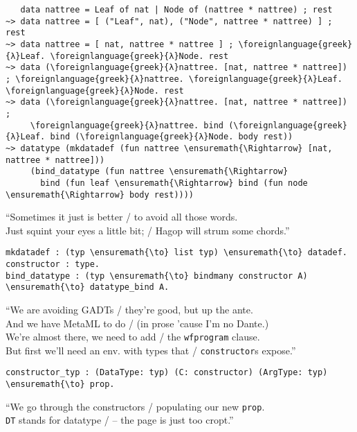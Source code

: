 \begin{verbatim}
   data nattree = Leaf of nat | Node of (nattree * nattree) ; rest
~> data nattree = [ ("Leaf", nat), ("Node", nattree * nattree) ] ; rest
~> data nattree = [ nat, nattree * nattree ] ; \foreignlanguage{greek}{λ}Leaf. \foreignlanguage{greek}{λ}Node. rest
~> data (\foreignlanguage{greek}{λ}nattree. [nat, nattree * nattree]) ; \foreignlanguage{greek}{λ}nattree. \foreignlanguage{greek}{λ}Leaf. \foreignlanguage{greek}{λ}Node. rest
~> data (\foreignlanguage{greek}{λ}nattree. [nat, nattree * nattree]) ;
     \foreignlanguage{greek}{λ}nattree. bind (\foreignlanguage{greek}{λ}Leaf. bind (\foreignlanguage{greek}{λ}Node. body rest))
~> datatype (mkdatadef (fun nattree \ensuremath{\Rightarrow} [nat, nattree * nattree]))
     (bind_datatype (fun nattree \ensuremath{\Rightarrow}
       bind (fun leaf \ensuremath{\Rightarrow} bind (fun node \ensuremath{\Rightarrow} body rest))))
\end{verbatim}

\begin{versy}
``Sometimes it just is better / to avoid all those words. \\
Just squint your eyes a little bit; / Hagop will strum some chords.''
\end{versy}

\begin{verbatim}
mkdatadef : (typ \ensuremath{\to} list typ) \ensuremath{\to} datadef.
constructor : type.
bind_datatype : (typ \ensuremath{\to} bindmany constructor A) \ensuremath{\to} datatype_bind A.
\end{verbatim}

\begin{versy}
``We are avoiding GADTs / they're good, but up the ante. \\
And we have MetaML to do / (in prose 'cause I'm no Dante.) \\
We're almost there, we need to add / the \texttt{wfprogram} clause. \\
But first we'll need an env. with types that / \texttt{constructor}s expose.''
\end{versy}

\begin{verbatim}
constructor_typ : (DataType: typ) (C: constructor) (ArgType: typ) \ensuremath{\to} prop.
\end{verbatim}

\begin{versy}
``We go through the constructors / populating our new \texttt{prop}. \\
\texttt{DT} stands for datatype / -- the page is just too cropt.''
\end{versy}

